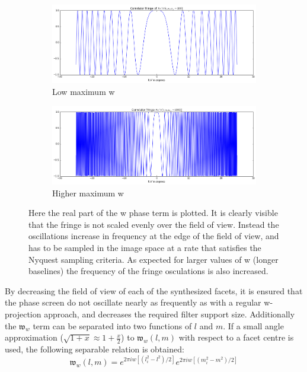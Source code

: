 \begin{figure}[h]
  \begin{mdframed}
    \centering
    \begin{subfigure}[b]{0.7\textwidth}
      \centering
      \includegraphics[width=\textwidth]{images/w_fringe_low_w.png}
      \caption{Low maximum w}
    \end{subfigure}  
    \begin{subfigure}[b]{0.7\textwidth}
      \centering
      \includegraphics[width=\textwidth]{images/w_fringe_high_w.png}
      \caption{Higher maximum w}
    \end{subfigure}
    \caption[w fringe in one dimension]{Here the real part of the w phase term is plotted. It is clearly visible that the fringe is not scaled evenly over the field of view.
	       Instead the oscillations increase in frequency at the edge of the field of view, and has to be sampled in the image space at a rate that
	       satisfies the Nyquest sampling criteria. As expected for larger values of w (longer baselines) the frequency of the fringe osculations is
	       also increased.}
    \label{fig_w_fringes}
  \end{mdframed}
\end{figure}

By decreasing the field of view of each of the synthesized facets, it is ensured that the phase screen do not oscillate nearly as frequently as with a regular w-projection approach,
and decreases the required filter support size. Additionally the $\mathfrak{w}_w$ term can be separated into two functions of $l$ and $m$. If a small angle 
approximation ($\sqrt{1+x}\approx1+\frac{x}{2}$) to $\mathfrak{w}_w(l,m)$ with respect to a facet centre is used, the following separable relation is obtained:
\begin{equation}
   \mathfrak{w}_w(l,m) = e^{2{\pi}iw[(l_i^2-l^2)/2]}e^{2{\pi}iw[(m_i^2-m^2)/2]}
\end{equation}

